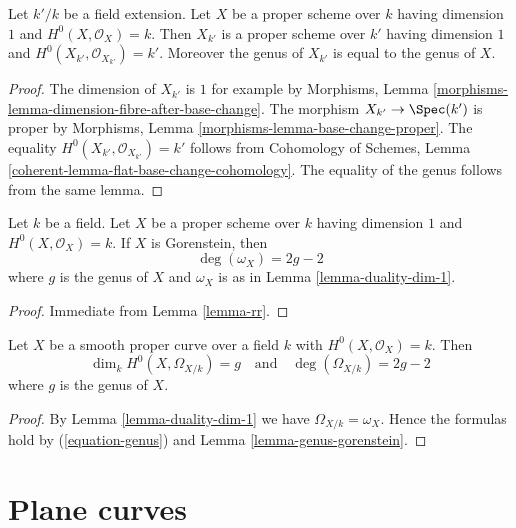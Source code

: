 \begin{lemma}
\label{lemma-genus-base-change}
Let $k'/k$ be a field extension. Let $X$ be a proper scheme over $k$ having
dimension $1$ and $H^0(X, \mathcal{O}_X) = k$. Then $X_{k'}$ is a
proper scheme over $k'$
having dimension $1$ and $H^0(X_{k'}, \mathcal{O}_{X_{k'}}) = k'$.
Moreover the genus of $X_{k'}$ is equal to the genus of $X$.
\end{lemma}

\begin{proof}
The dimension of $X_{k'}$ is $1$ for example by
Morphisms, Lemma \ref{morphisms-lemma-dimension-fibre-after-base-change}.
The morphism $X_{k'} \to \Spec(k')$ is proper by
Morphisms, Lemma \ref{morphisms-lemma-base-change-proper}.
The equality $H^0(X_{k'}, \mathcal{O}_{X_{k'}}) = k'$ follows from
Cohomology of Schemes, Lemma
\ref{coherent-lemma-flat-base-change-cohomology}.
The equality of the genus follows from the same lemma.
\end{proof}

\begin{lemma}
\label{lemma-genus-gorenstein}
Let $k$ be a field. Let $X$ be a proper scheme over $k$ having
dimension $1$ and $H^0(X, \mathcal{O}_X) = k$. If $X$ is Gorenstein,
then
$$
\deg(\omega_X) = 2g - 2
$$
where $g$ is the genus of $X$ and $\omega_X$ is as in
Lemma \ref{lemma-duality-dim-1}.
\end{lemma}

\begin{proof}
Immediate from Lemma \ref{lemma-rr}.
\end{proof}

\begin{lemma}
\label{lemma-genus-smooth}
Let $X$ be a smooth proper curve over a field $k$
with $H^0(X, \mathcal{O}_X) = k$. Then
$$
\dim_k H^0(X, \Omega_{X/k}) = g
\quad\text{and}\quad
\deg(\Omega_{X/k}) = 2g - 2
$$
where $g$ is the genus of $X$.
\end{lemma}

\begin{proof}
By Lemma \ref{lemma-duality-dim-1} we have $\Omega_{X/k} = \omega_X$.
Hence the formulas hold by (\ref{equation-genus}) and
Lemma \ref{lemma-genus-gorenstein}.
\end{proof}






\section{Plane curves}
\label{section-plane-curves}

